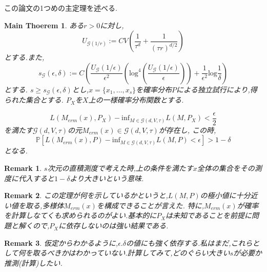 \documentclass{ujarticle}
\newtheorem*{rem}{Remark}
\newtheorem{mtm}{Main Thoerem}
\begin{document}
この論文の1つめの主定理を述べる.
\begin{mtm}
\label{mth1}
 ある$r > 0$に対し,
 \begin{equation*}
  U_{\mathcal{G}(1/r)}:=CV( \frac{ 1 }{ \tau^d } + \frac{ 1 }{ (\tau r)^{d/2} } )
 \end{equation*}
 とする.また,
 \begin{equation*}
  s_{\mathcal{G}}(\epsilon,\delta):=C(\frac{ U_{\mathcal{G}}(1/\epsilon) }{ \epsilon^2 }(\mathrm{log}^4
  (\frac{U_{\mathcal{G}}(1/\epsilon)}{\epsilon})) + \frac{ 1 }{ \epsilon^2 }\mathrm{log}\frac{ 1 }{ \delta }  )
 \end{equation*}
とする.
$s \ge s_{\mathcal{G}}(\epsilon,\delta)$とし,$x=\{ x_1,\dots,x_s\}$を確率分布$P$による独立試行により,得られた集合とする.
$P_X$を$X$上の一様確率分布関数とする.

\begin{equation*}
 L(M_{erm}(x),P_X) - \mathrm{inf}_{M \in \mathcal{G}(d,V,\tau)} L(M,P_X) < \frac{ \epsilon }{ 2 }
\end{equation*}
を満たす$\mathcal{G}(d,V,\tau)$の元$M_{erm}(x) \in \mathcal{G}(d,V,\tau)$が存在し,
この時,
\begin{equation*}
 \mathbb{P}[L(M_{erm}(x),P) - \mathrm{inf}_{M \in \mathcal{G}(d,V,\tau)} L(M,P) < \epsilon] > 1- \delta
\end{equation*}
となる.
\end{mtm}
\begin{rem}
 $s$次元の直積測度で考えた時,上の条件を満たす$x$全体の集合をその測度に代入すると$1- \delta$より大きいという意味.
\end{rem}
\begin{rem}
 この定理が何を示しているかというと,$L(M,P)$の極小値に十分近い値を取る,多様体$M_{erm}(x)$を構成できることが言えた.
 特に,$M_{erm}(x)$が確率を計算しなてくも求められるのがよい.基本的に$P_X$は未知であることを前提に問題と解くので,$P_X$に依存しないのは強い結果である.
\end{rem}
\begin{rem}
  仮定からわかるように,$\epsilon.\delta$の値にも強く依存する.私はまだ,これらとして何を取るべきかはわかっていない.計算してみて,どのぐらい大きい$s$が必要か推測(計算)したい.
\end{rem}
\end{document}
